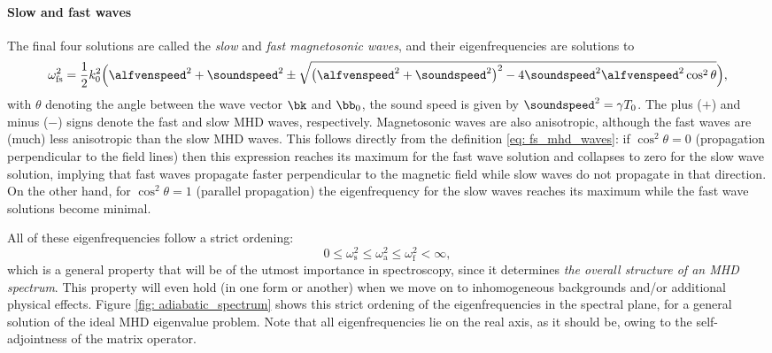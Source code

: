\paragraph{Slow and fast waves}
The final four solutions are called the \emph{slow} and \emph{fast magnetosonic waves}, and their eigenfrequencies are solutions to
\begin{equation} \label{eq: fs_mhd_waves}
  \omega_\text{fs}^2 = \frac{1}{2}k_0^2\Bigl(
    \alfvenspeed^2 + \soundspeed^2 \pm \sqrt{
      \left(\alfvenspeed^2 + \soundspeed^2\right)^2 - 4 \soundspeed^2 \alfvenspeed^2 \cos^2\theta
    }
  \Bigr),
\end{equation}
with $\theta$ denoting the angle between the wave vector $\bk$ and $\bb_0$, the sound speed is given by $\soundspeed^2 = \gamma T_0$. The plus ($+$) and minus ($-$) signs denote the fast and slow MHD waves, respectively. Magnetosonic waves are also anisotropic, although the fast waves are (much) less anisotropic than the slow MHD waves. This follows directly from the definition \eqref{eq: fs_mhd_waves}: if $\cos^2\theta = 0$ (propagation perpendicular to the field lines) then this expression reaches its maximum for the fast wave solution and collapses to zero for the slow wave solution, implying that fast waves propagate faster perpendicular to the magnetic field while slow waves do not propagate in that direction. On the other hand, for $\cos^2\theta = 1$ (parallel propagation) the eigenfrequency for the slow waves reaches its maximum while the fast wave solutions become minimal.

All of these eigenfrequencies follow a strict ordening:
\begin{equation} \label{eq: omega_ordening}
  0 \leq \omega_\text{s}^2 \leq \omega_\text{a}^2 \leq \omega_\text{f}^2 < \infty,
\end{equation}
which is a general property that will be of the utmost importance in spectroscopy, since it determines \emph{the overall structure of an MHD spectrum}. This property will even hold (in one form or another) when we move on to inhomogeneous backgrounds and/or additional physical effects. Figure \ref{fig: adiabatic_spectrum} shows this strict ordening of the eigenfrequencies in the spectral plane, for a general solution of the ideal MHD eigenvalue problem. Note that all eigenfrequencies lie on the real axis, as it should be, owing to the self-adjointness of the matrix operator.

